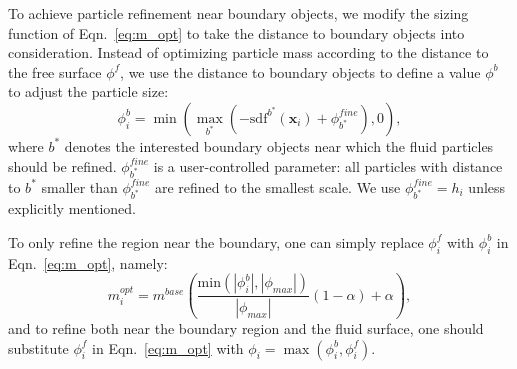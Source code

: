 \documentclass[VANCOUVER,STIX1COL]{WileyNJD-v2}
\begin{document}
To achieve particle refinement near boundary objects, we modify the sizing function of Eqn.~\ref{eq:m_opt} to take the distance to boundary objects into consideration. Instead of optimizing particle mass according to the distance to the free surface $\phi^f$, we use the distance to boundary objects to define a value $\phi^b$ to adjust the particle size:
\begin{equation}
    \phi_i^b = \min\left(\max_{b^*}\left(-\mathrm{sdf}^{b^*}(\mathbf{x}_i) + \phi_{b^*}^{fine}\right), 0\right),
    \label{eq:bound_distance}
\end{equation}
where $b^*$ denotes the interested boundary objects near which the fluid particles should be refined. $\phi_{b^*}^{fine}$ is a user-controlled parameter: all particles with distance to $b^*$ smaller than $\phi_{b^*}^{fine}$ are refined to the smallest scale. We use $\phi_{b^*}^{fine} = h_i$ unless explicitly mentioned.

To only refine the region near the boundary, one can simply replace $\phi_i^f$ with $\phi_i^b$ in Eqn.~\ref{eq:m_opt}, namely:
\begin{equation}
    m_i^{opt} = m^{base}\left(
    \frac{\mathrm{min}(|\phi_i^b|,|\phi_{max}|)}{|\phi_{max}|}
    (1 - \alpha) + \alpha
    \right),
    \label{eq:refine_bound}
\end{equation}
and to refine both near the boundary region and the fluid surface, one should substitute $\phi_i^f$ in Eqn.~\ref{eq:m_opt} with $\phi_i = \max(\phi_i^b, \phi_i^f)$.
\end{document}
